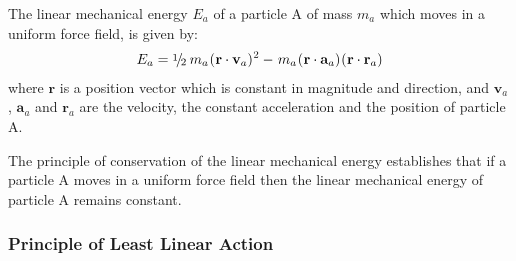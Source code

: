 \documentclass[10pt]{article}
\newcommand{\mM}{m}
\newcommand{\mE}{E}
\newcommand{\ra}{_a}
\newcommand{\vR}{\mathbf{r}}
\newcommand{\vV}{\mathbf{v}}
\newcommand{\vA}{\mathbf{a}}
\newcommand{\med}{\raise.5ex\hbox{$\scriptstyle 1$}\kern-.15em/\kern-.15em\lower.25ex\hbox{$\scriptstyle 2$}}
\begin{document}
\par The linear mechanical energy $\mE\ra$ of a particle A of mass $\mM\ra$ which moves in a uniform force field, is given by:
\begin{eqnarray*}
\mE\ra = \med \hspace{+0.24em} \mM\ra \hspace{+0.06em} (\hspace{+0.03em} \vR \cdot \vV\ra)^{\hspace{+0.03em} 2} - \hspace{+0.09em} \mM\ra \hspace{+0.06em} (\hspace{+0.03em} \vR \cdot \vA\ra) \hspace{+0.06em} (\hspace{+0.03em} \vR \cdot \vR\ra)
\end{eqnarray*}
\noindent where $\vR$ is a position vector which is constant in magnitude and direction, and $\vV\ra$, $\vA\ra$ and $\vR\ra$ are the velocity, the constant acceleration and the position of particle A.
\medskip
\par The principle of conservation of the linear mechanical energy establishes that if a particle A moves in a uniform force field then the linear mechanical energy of particle A remains constant.

\newpage

{\centering\subsubsection*{Principle of Least Linear Action}}

\vspace{+0.75em}
\end{document}
